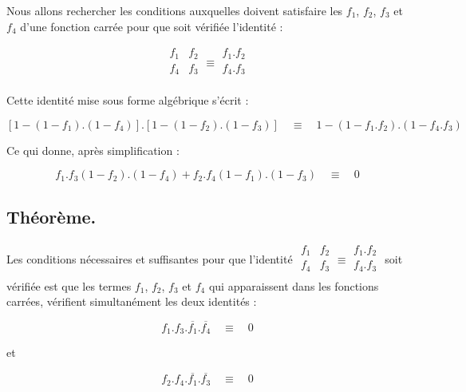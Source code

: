 Nous allons rechercher les conditions auxquelles doivent satisfaire les $f_1$, $f_2$, $f_3$ et $f_4$ d'une fonction carrée pour que soit vérifiée l'identité : 

\medskip

\[
\begin{array}{|c|c|} f_1 & f_2 \\f_4 & f_3 \\      \end{array} \equiv \begin{array}{|c|} f_1 . f_2 \\ f_4 . f_3 \\ \end{array} 
\]

\medskip 

Cette identité mise sous forme algébrique s'écrit : 

\medskip

\[
\left[ 1 - (1 -f_1) . (1 - f_4) \right] . \left[ 1 - (1 -f_2) . (1- f_3)\right] \quad  \equiv \quad 1 -(1-f_1 . f_2) . (1 - f_4 . f_3)
\]

\medskip 

Ce qui donne, après simplification : 

\medskip

\[
f_1 . f_3 (1-f_2) . (1-f_4) + f_2 . f_4 (1 -f_1) . (1-f_3) \quad  \equiv \quad  0 
\]

\medskip 


\subsection{Théorème.} Les conditions nécessaires et suffisantes pour que l'identité $\begin{array}{|c|c|} f_1 & f_2 \\f_4 & f_3 \\      \end{array} \equiv \begin{array}{|c|} f_1 . f_2 \\ f_4 . f_3 \\ \end{array} $ soit vérifiée est que les termes 
 $f_1$, $f_2$, $f_3$ et $f_4$ qui apparaissent dans les fonctions carrées, vérifient simultanément les deux identités : 
 
\[ f_1 . f_3 . \overline{f_1} . \overline{f_4} \quad  \equiv \quad 0 \] 

et  

\[ f_2 . f_4 . \overline{f_1} . \overline{f_3} \quad  \equiv \quad 0 \] 

